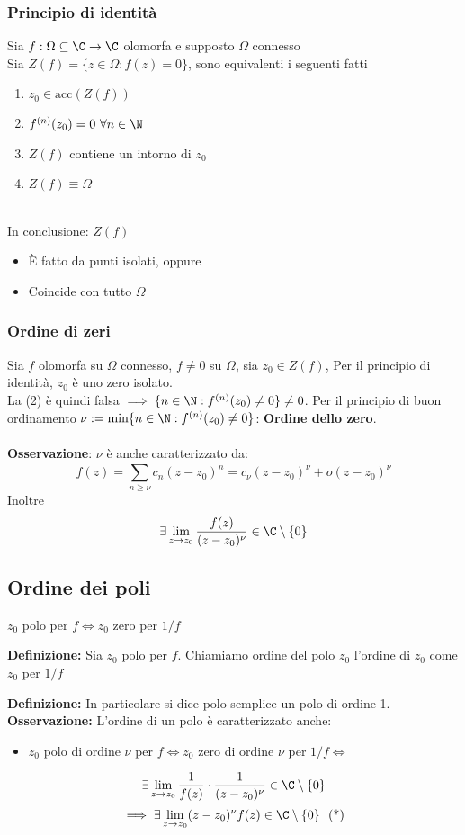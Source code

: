 \subsubsection{Principio di identità}
Sia $f:\Omega \subseteq  \C\to \C$ olomorfa e supposto $\Omega$ connesso
\\Sia $Z(f)=\{z\in\Omega : f(z)=0\} $, sono equivalenti i seguenti fatti
\begin{enumerate}
	
	\item $z_0\in \text{acc}(Z(f))$
	\item $f^{(n)}(z_0)=0\ \forall n\in\N$
	\item $Z(f)$ contiene un intorno di $z_0$
	\item $Z(f)\equiv\Omega$
\end{enumerate}
\\In conclusione: $Z(f)$
\begin{itemize}
	\item È fatto da punti isolati, oppure 
	\item Coincide con tutto $\Omega$ 
\end{itemize}
\subsubsection{Ordine di zeri}
Sia $f$ olomorfa su $\Omega$ connesso, $f\neq 0$ su $\Omega$, sia $z_0\in Z(f)$, Per il principio di identità, $z_0$ è uno zero isolato.
\\La (2) è quindi falsa $\implies \{n\in\N: f^{(n)}(z_0)\neq 0\} \neq 0$. Per il principio di buon ordinamento $\nu := \text{min}\{n\in\N: f^{(n)}(z_0)\neq 0\} $: \textbf{Ordine dello zero}.\\
\\\textbf{Osservazione}: $\nu$ è anche caratterizzato da:
\[f(z)=\sum_{n\ge \nu}^{} c_n(z-z_0)^n=c_\nu(z-z_0)^\nu+o(z-z_0)^\nu\]
Inoltre
\[\exists \lim_{z \to z_0} \frac{f(z)}{(z-z_0)^\nu}\in\C\setminus \{0\} \]
\subsection{Ordine dei poli}
$z_0$ polo per $f\iff z_0$ zero per $1 / f$
\begin{tcolorbox}	
\textbf{Definizione:} Sia $z_0$ polo per $f$. Chiamiamo ordine del polo $z_0$ l'ordine di $z_0$ come $z_0$ per $1 / f$
\end{tcolorbox}
\textbf{Definizione: }In particolare si dice polo semplice un polo di ordine 1.
\textbf{Osservazione:} L'ordine di un polo è caratterizzato anche:
\begin{itemize}
	\item $z_0$ polo di ordine $\nu$ per $f \iff z_0$ zero di ordine $\nu$ per $1 / f\iff$
\end{itemize}
		\[\exists \lim_{z \to z_0} \frac{1}{f(z)}\cdot \frac{1}{(z-z_0)^\nu}\in\C\setminus \{0\}\]
		\[\implies \exists \lim_{z \to z_0} (z-z_0)^\nu f(z)\in\C\setminus \{0\} \ \text{ (*)}\]

